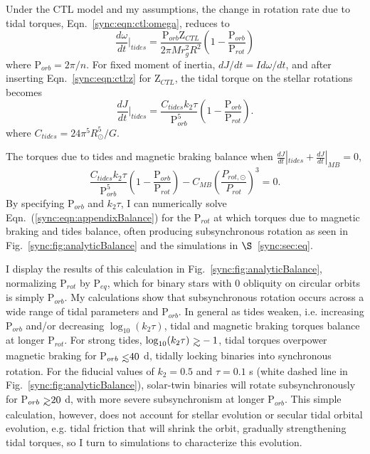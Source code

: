 Under the CTL model and my assumptions, the change in rotation rate due to tidal torques, Eqn.~\ref{sync:eqn:ctl:omega}, reduces to 
\begin{equation}
    \frac{d\omega}{dt}\Bigg|_{tides} = \frac{\mathrm{P}_{orb}\mathrm{Z}_{CTL}}{2 \pi M r_g^2 R^2}\left( 1 - \frac{\mathrm{P}_{orb}}{\mathrm{P}_{rot}} \right)
\end{equation}
where P$_{orb} = 2 \pi/n$.  For fixed moment of inertia, $dJ/dt =I d\omega/dt$, and after inserting Eqn.~\ref{sync:eqn:ctl:z} for Z$_{CTL}$, the tidal torque on the stellar rotations becomes
\begin{equation}
    \frac{dJ}{dt}\Bigg|_{tides} = \frac{C_{tides} k_2 \tau}{\mathrm{P}_{orb}^5}\left( 1 - \frac{\mathrm{P}_{orb}}{\mathrm{P}_{rot}} \right).
\end{equation}
where $C_{tides} = 24 \pi^5 R_{\odot}^5 / G$. 

The torques due to tides and magnetic braking balance when $ \frac{dJ}{dt}|_{tides} +  \frac{dJ}{dt}|_{MB} = 0$, 
\begin{equation} \label{sync:eqn:appendixBalance}
    \frac{C_{tides} k_2 \tau}{\mathrm{P}_{orb}^5}\left( 1 - \frac{\mathrm{P}_{orb}}{\mathrm{P}_{rot}} \right) -C_{MB} \left( \frac{P_{rot,\odot}}{P_{rot}} \right)^3 = 0.
\end{equation}
By specifying P$_{orb}$ and $k_2 \tau$, I can numerically solve Eqn.~(\ref{sync:eqn:appendixBalance}) for the P$_{rot}$ at which torques due to magnetic braking and tides balance, often producing subsynchronous rotation as seen in Fig.~\ref{sync:fig:analyticBalance} and the simulations in $\S$~\ref{sync:sec:eq}.

I display the results of this calculation in Fig.~\ref{sync:fig:analyticBalance}, normalizing P$_{rot}$ by P$_{eq}$, which for binary stars with 0 obliquity on circular orbits is simply P$_{orb}$. My calculations show that subsynchronous rotation occurs across a wide range of tidal parameters and P$_{orb}$. In general as tides weaken, i.e. increasing P$_{orb}$ and/or decreasing $\log_{10}(k_2 \tau)$, tidal and magnetic braking torques balance at longer P$_{rot}$. For strong tides, $\log_{10}(k_2 \tau) \gsim -1$, tidal torques overpower magnetic braking for P$_{orb} \lsim 40$ d, tidally locking binaries into synchronous rotation. For the fiducial values of $k_2 = 0.5$ and $\tau = 0.1$ s (white dashed line in Fig.~\ref{sync:fig:analyticBalance}), solar-twin binaries will rotate subsynchronously for P$_{orb} \gsim 20$ d, with more severe subsynchronism at longer P$_{orb}$. This simple calculation, however, does not account for stellar evolution or secular tidal orbital evolution, e.g. tidal friction that will shrink the orbit, gradually strengthening tidal torques, so I turn to simulations to characterize this evolution. 

